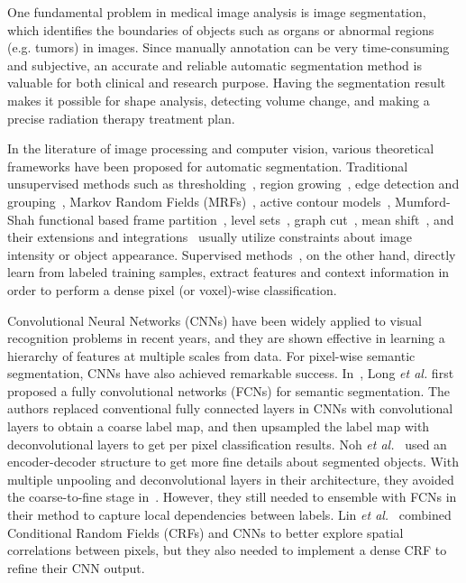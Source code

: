 \documentclass[twocolumn]{svjour3}
\begin{document}
One fundamental problem in medical image analysis is image segmentation, which identifies the boundaries of objects such as organs or abnormal regions (e.g. tumors) in images. Since manually annotation can be very time-consuming and subjective, an accurate and reliable automatic segmentation method is valuable for both clinical and research purpose. Having the segmentation result makes it possible for shape analysis, detecting volume change, and making a precise radiation therapy treatment plan.

In
the literature of image processing and computer vision, various theoretical frameworks have been proposed for automatic segmentation. Traditional unsupervised methods such as thresholding~\cite{otsu1979threshold}, region growing~\cite{adams1994seeded}, edge detection and grouping~\cite{canny1986computational}, Markov Random Fields (MRFs)~\cite{manjunath1991unsupervised}, active contour models~\cite{kass1988snakes}, Mumford-Shah functional based frame partition~\cite{mumford1989optimal}, level sets~\cite{malladi1995shape}, graph cut~\cite{shi2000normalized}, mean shift~\cite{comaniciu2002mean}, and their extensions and integrations~\cite{gooya2011deformable, lee2008segmenting, lefohn2003interactive} usually utilize constraints about image intensity or object appearance.  Supervised methods~\cite{menze2015multimodal,cobzas20073d, geremia2011spatial, wels2008discriminative,ronneberger2015u, havaei2017brain}, on the other hand, directly learn from labeled training samples, extract features and context information in order to perform a dense pixel (or voxel)-wise classification.







Convolutional Neural Networks (CNNs) have been widely applied to visual recognition problems in recent years, and they are shown effective in learning a hierarchy of features at multiple scales from data. For pixel-wise semantic segmentation, CNNs have also achieved remarkable success.  In~\cite{long2015fully}, Long \emph{et al.} first proposed a fully convolutional networks (FCNs) for semantic segmentation.  The authors replaced conventional fully connected layers in CNNs with convolutional layers to obtain a coarse label map, and then upsampled the label map with deconvolutional layers to get per pixel classification results.  Noh \emph{et al.}~\cite{noh2015learning} used an encoder-decoder structure to get more fine details about segmented objects.
With multiple unpooling and deconvolutional layers in their architecture, they avoided the coarse-to-fine stage in~\cite{long2015fully}. However, they still needed to ensemble with FCNs in their method to capture local dependencies between labels.  Lin \emph{et al.}~\cite{lin2016efficient} combined Conditional Random Fields (CRFs) and CNNs to better explore spatial correlations between pixels, but they also needed to implement a dense CRF to refine their CNN output.
\end{document}
